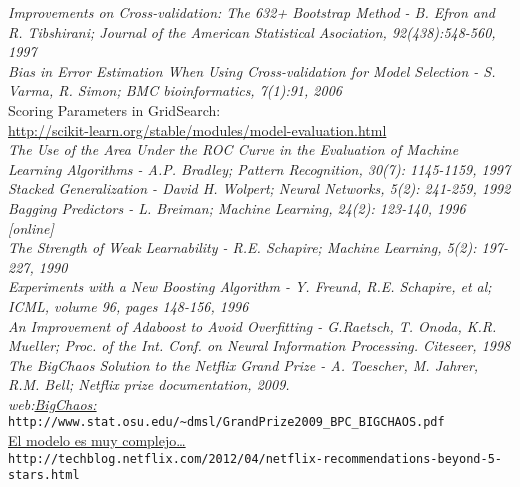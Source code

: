 \documentclass[12pt]{article}
\begin{document}
\textit{Improvements on Cross-validation: The 632+ Bootstrap Method - B. Efron and R. Tibshirani; Journal of the American Statistical Asociation, 92(438):548-560, 1997}\\

\textit{Bias in Error Estimation When Using Cross-validation for Model Selection - S. Varma, R. Simon; BMC bioinformatics, 7(1):91, 2006}\\

Scoring Parameters in GridSearch:\\
\href{http://scikit-learn.org/stable/modules/model-evaluation.html}{http://scikit-learn.org/stable/modules/model-evaluation.html}\\

\textit{The Use of the Area Under the ROC Curve in the Evaluation of Machine Learning Algorithms - A.P. Bradley; Pattern Recognition, 30(7): 1145-1159, 1997}\\

\textit{Stacked Generalization - David H. Wolpert; Neural Networks, 5(2): 241-259, 1992}\\

\textit{Bagging Predictors - L. Breiman; Machine Learning, 24(2): 123-140, 1996 [online]}\\

\textit{The Strength of Weak Learnability - R.E. Schapire; Machine Learning, 5(2): 197-227, 1990}\\

\textit{Experiments with a New Boosting Algorithm - Y. Freund, R.E. Schapire, et al; ICML, volume 96, pages 148-156, 1996}\\

\textit{An Improvement of Adaboost to Avoid Overfitting - G.Raetsch, T. Onoda, K.R. Mueller; Proc. of the Int. Conf. on Neural Information Processing. Citeseer, 1998}\\

\textit{The BigChaos Solution to the Netflix Grand Prize - A. Toescher, M. Jahrer, R.M. Bell; Netflix prize documentation, 2009. \\web:\href{http://www.stat.osu.edu/~dmsl/GrandPrize2009_BPC_BigChaos.pdf}{BigChaos: }}\verb+http://www.stat.osu.edu/~dmsl/GrandPrize2009_BPC_BIGCHAOS.pdf+\\

\href{http://techblog.netflix.com/2012/04/netflix-recommendations-beyond-5-stars.html}{El modelo es muy complejo\ldots}\\ \verb+http://techblog.netflix.com/2012/04/netflix-recommendations-beyond-5-stars.html+\\
\end{document}
